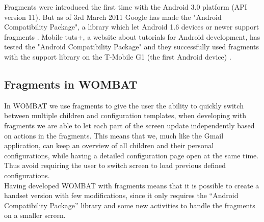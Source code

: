 Fragments were introduced the first time with the Android 3.0 platform (API version 11). 
But as of 3rd March 2011 Google has made the "Android Compatibility Package", a library which let Android 1.6 devices or newer support fragments \cite{web:android:fragments:support}.
Mobile tuts+, a website about tutorials for Android development, has tested the "Android Compatibility Package" and they successfully used fragments with the support library on the T-Mobile G1 (the first Android device) \cite{web:android:fragments:compatibility}.
 
\subsection{Fragments in WOMBAT}
In WOMBAT we use fragments to give the user the ability to quickly switch between multiple children and configuration templates, when developing with fragments we are able to let each part of the screen update independently based on actions in the fragments.
This means that we, much like the Gmail application, can keep an overview of all children and their personal configurations, while having a detailed configuration page open at the same time.
Thus avoid requiring the user to switch screen to load previous defined configurations.\\

Having developed WOMBAT with fragments means that it is possible to create a handset version with few modifications, since it only requires the "`Android Compatibility Package"' library and some new activities to handle the fragments on a smaller screen.